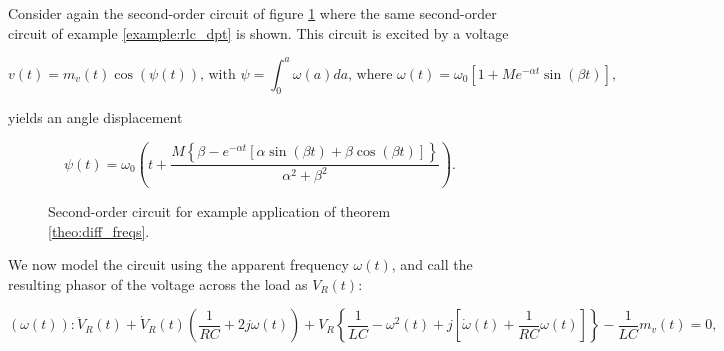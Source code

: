 \begin{example}\label{example:diff_freqs} %

	Consider again the second-order circuit of figure \ref{fig:different_freqs_example_network_1p} where the same second-order circuit of example \ref{example:rlc_dpt} is shown. This circuit is excited by a voltage

\begin{equation} v(t) = m_v(t)\cos\left(\psi(t)\right) \text{, with } \psi = \int_0^a \omega(a)da \text{, where } \omega(t) = \omega_0\left[1 + Me^{-\alpha t}\sin\left(\beta t\right)\right], \label{eq:example_voltage_def}\end{equation}

 	\noindent yields an angle displacement

\begin{equation} \psi(t) = \omega_0\left(t + \dfrac{M\left\{\beta - e^{-\alpha t}\left[\alpha\sin\left(\beta t\right) + \beta\cos\left(\beta t\right)\right]\right\}}{\alpha^2 + \beta^2} \right) .\end{equation}

\begin{figure}[htb!]
\centering
	\caption{Second-order circuit for example application of theorem \ref{theo:diff_freqs}.}
	\label{fig:different_freqs_example_network_1p}
\end{figure} %

	We now model the circuit using the apparent frequency $\omega(t)$, and call the resulting phasor of the voltage across the load as $V_R(t)$:

\begin{equation}\left(\omega(t)\right): \ddot{V}_R(t) + \dot{V}_R(t)\left(\dfrac{1}{RC} + 2j\omega(t)\right) + V_R\left\{ \dfrac{1}{LC}  -\omega^2(t) + j \left[ \dot{\omega}(t) + \dfrac{1}{RC}\omega(t)\right]\right\} -\dfrac{1}{LC} m_v(t) = 0, \label{eq:rlc_complex_diffeq_1}\end{equation}


\end{example}
